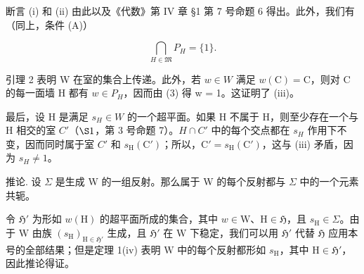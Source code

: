 断言 (i) 和 (ii) 由此以及《代数》第 IV 章 §1 第 7 号命题 6 得出。此外，我们有（同上，条件 (A)）

\[
\bigcap_ {H \in \mathfrak {M}} P _ {H} = \{1 \}.\tag{3}
\]

引理 2 表明 W 在室的集合上传递。此外，若 \(w \in W\) 满足 \(w(\mathrm{C}) = \mathrm{C}\)，则对 C 的每一面墙 H 都有 \(w \in P_{H}\)，因而由 (3) 得 w = 1。这证明了 (iii)。

最后，设 H 是满足 \(s_{H} \in W\) 的一个超平面。如果 H 不属于 H，则至少存在一个与 H 相交的室 \(C'\)（\(\S1\)，第 3 号命题 7）。\(H \cap C'\) 中的每个交点都在 \(s_{H}\) 作用下不变，因而同时属于室 \(C'\) 和 \(s_{\mathrm{H}}(\mathrm{C}')\)；所以，\(\mathrm{C}' = s_{\mathrm{H}}(\mathrm{C}')\)，这与 (iii) 矛盾，因为 \(s_{H} \neq 1\)。

推论. 设 \(\Sigma\) 是生成 W 的一组反射。那么属于 W 的每个反射都与 \(\Sigma\) 中的一个元素共轭。

令 \(\mathfrak{H}'\) 为形如 \(w(\mathrm{H})\) 的超平面所成的集合，其中 \(w \in \mathrm{W}\)、\(\mathrm{H} \in \mathfrak{H}\)，且 \(s_{\mathrm{H}} \in \Sigma\)。由于 \(\mathrm{W}\) 由族 \((s_{\mathrm{H}})_{\mathrm{H} \in \mathfrak{H}'}\) 生成，且 \(\mathfrak{H}'\) 在 \(\mathrm{W}\) 下稳定，我们可以用 \(\mathfrak{H}'\) 代替 \(\mathfrak{H}\) 应用本号的全部结果；但是定理 1(iv) 表明 \(\mathrm{W}\) 中的每个反射都形如 \(s_{\mathrm{H}}\)，其中 \(\mathrm{H} \in \mathfrak{H}'\)，因此推论得证。


